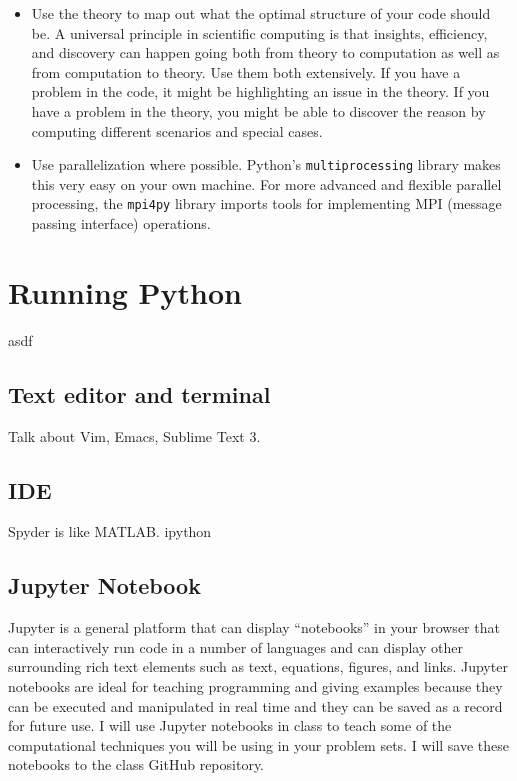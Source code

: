 \begin{itemize}
    \item Use the theory to map out what the optimal structure of your code should be. A universal principle in scientific computing is that insights, efficiency, and discovery can happen going both from theory to computation as well as from computation to theory. Use them both extensively. If you have a problem in the code, it might be highlighting an issue in the theory. If you have a problem in the theory, you might be able to discover the reason by computing different scenarios and special cases.
    \item Use parallelization where possible. Python's \texttt{multiprocessing} library makes this very easy on your own machine. For more advanced and flexible parallel processing, the \texttt{mpi4py} library imports tools for implementing MPI (message passing interface) operations.
  \end{itemize}


\section{Running Python}\label{SecPythonRun}

  asdf

  \subsection{Text editor and terminal}\label{SecPythonRunText}

    Talk about Vim, Emacs, Sublime Text 3.


  \subsection{IDE}\label{SecPythonRunIDE}

    Spyder is like MATLAB. ipython


  \subsection{Jupyter Notebook}\label{SecPythonRunJupyt}

    Jupyter is a general platform that can display ``notebooks'' in your browser that can interactively run code in a number of languages and can display other surrounding rich text elements such as text, equations, figures, and links. Jupyter notebooks are ideal for teaching programming and giving examples because they can be executed and manipulated in real time and they can be saved as a record for future use. I will use Jupyter notebooks in class to teach some of the computational techniques you will be using in your problem sets. I will save these notebooks to the class GitHub repository.

